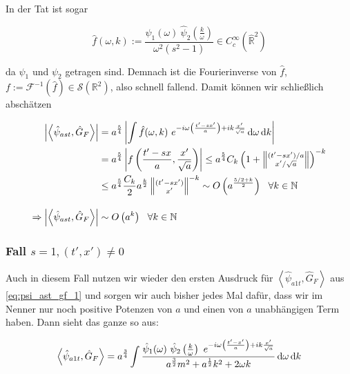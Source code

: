 In der Tat ist sogar

\begin{equation}
    \hat f(\omega, k) := \frac{\hat \psi_1 (\omega)~\hat\psi_2 \left(\frac{k}{\omega}\right)}
    {\omega^2(s^2-1)}
    \in C_c^\infty (\hat{\mathbb{R}}^2)
\end{equation}

da $\psi_1$ und $\psi_2$ getragen sind. Demnach ist die Fourierinverse von
$\hat f$, $f := \mathcal{F}^{-1}(\hat f) \in \mathcal{S}(\mathbb{R}^2)$, also schnell
fallend. Damit können wir schließlich abschätzen

\begin{align}
    \left| \left< \hat\psi_{ast}, \hat G_F \right> \right|
    &=
    a^\frac{5}{4} \left|  \int \hat f(\omega, k)
    ~e^{-i \omega \left(\frac{t'-sx'}{a}\right) + ik \frac{x'}{\sqrt{a}}}
    \mathop{}\!\mathrm{d} \omega \mathop{}\!\mathrm{d} k
    \right|
    \nonumber \\
    &=
    a^\frac{5}{4} \left| f \left(\frac{t'-sx}{a}, \frac{x'}{\sqrt{a}}\right) \right|
    \leq
    a^\frac{5}{4} C_k\left(
    1 + \left\lVert \substack{(t'-sx')/a \\ x'/\sqrt{a}} \right\rVert
    \right)^{-k}
    \nonumber \\
    &\leq
    a^\frac{5}{4} \frac{C_k}{2} a^{\frac{k}{2}} \left\lVert
    \substack{(t'-sx') \\ x'} \right\rVert^{-k}
    \sim O\left(a^\frac{5/2+k}{2}\right) ~~ \forall k \in \mathbb{N}
    \nonumber \\[1em]
    \Rightarrow
     \left| \left< \hat\psi_{ast}, \hat G_F \right> \right|
     &\sim
     O\left(a^k\right) ~~ \forall k \in \mathbb{N}
\end{align}


\subsubsection*{Fall $s = 1, (t', x') \neq 0$}
Auch in diesem Fall nutzen wir wieder den ersten Ausdruck für
$\left< \hat\psi_{a1t}, \hat G_F \right>$ aus \eqref{eq:psi_ast_gf_1} und sorgen
wir auch bisher jedes Mal dafür, dass wir im Nenner nur noch positive Potenzen von
$a$ und einen von $a$ unabhängigen Term haben. Dann sieht das ganze so aus:

\begin{equation*}
    \left< \hat\psi_{a1t}, \hat G_F \right>
    =
    a^\frac{3}{4} \int \frac{\hat \psi_1(\omega)
    ~\hat\psi_2 \left(\frac{k}{\omega}\right)
    ~ e^{-i \omega \left(\frac{t'-x'}{a}\right) + i k \frac{x'}{\sqrt{a}}}
    }
    {
        a^\frac{3}{2} m^2 + a^\frac{1}{2} k^2 + 2 \omega k
    }
    \mathop{}\!\mathrm{d} \omega \mathop{}\!\mathrm{d} k
\end{equation*}

